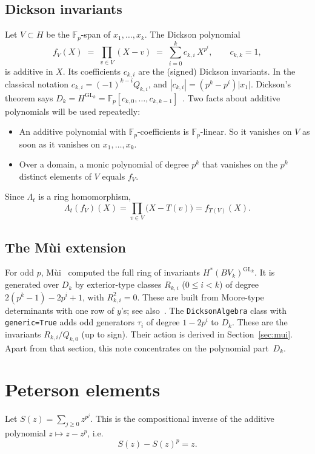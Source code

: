 \documentclass[11pt]{amsart}
\theoremstyle{definition}
\theoremstyle{remark}
\newcommand{\F}{\mathbb{F}_p}
\newcommand{\Dk}{D_k}
\newcommand{\code}[1]{\texttt{#1}}
\DeclareMathOperator{\GL}{GL}
\begin{document}
\subsection{Dickson invariants}
Let $V\subset H$ be the $\F$-span of $x_1,\dots,x_k$.  The Dickson polynomial
\[
  f_V(X)\;=\;\prod_{v\in V}(X-v)\;=\;\sum_{i=0}^k c_{k,i}\,X^{p^i},\qquad c_{k,k}=1,
\]
is additive in $X$.  Its coefficients $c_{k,i}$ are the (signed) Dickson
invariants.  In the classical notation $c_{k,i}=(-1)^{k-i}Q_{k,i}$, and
$|c_{k,i}|=(p^k-p^i)|x_1|$.  Dickson's theorem says
$\Dk=H^{\GL_k}=\F[c_{k,0},\dots,c_{k,k-1}]$~\cite{Dickson}.  Two facts about
additive polynomials will be used repeatedly:
\begin{itemize}
\item[(D1)] An additive polynomial with $\F$-coefficients is $\F$-linear.  So it
  vanishes on $V$ as soon as it vanishes on $x_1,\dots,x_k$.
\item[(D2)] Over a domain, a monic polynomial of degree $p^k$ that vanishes on
  the $p^k$ distinct elements of $V$ equals $f_V$.
\end{itemize}
Since $\Lambda_t$ is a ring homomorphism,
\begin{equation}\label{eq:Lf}
  \Lambda_t(f_V)(X)=\prod_{v\in V}\bigl(X-T(v)\bigr)=f_{T(V)}(X).
\end{equation}

\subsection{The M\`ui extension}
For odd $p$, M\`ui~\cite{Mui} computed the full ring of invariants
$H^*(BV_k)^{\GL_k}$.  It is generated over $\Dk$ by exterior-type classes
$R_{k,i}$ ($0\le i<k$) of degree $2(p^k-1)-2p^i+1$, with $R_{k,i}^2=0$.  These
are built from Moore-type determinants with one row of $y$'s; see
also~\cite{KamekoMimura}.  The \code{DicksonAlgebra} class with
\code{generic=True} adds odd generators $\tau_i$ of degree $1-2p^i$ to $\Dk$.
These are the invariants $R_{k,i}/Q_{k,0}$ (up to sign).  Their action is
derived in Section~\ref{sec:mui}.  Apart from that section, this note
concentrates on the polynomial part~$\Dk$.

\section{Peterson elements}\label{sec:peterson}

Let $S(z)=\sum_{j\ge0}z^{p^j}$.  This is the compositional inverse of the
additive polynomial $z\mapsto z-z^p$, i.e.
\begin{equation}\label{eq:S}
  S(z)-S(z)^p=z .
\end{equation}
\end{document}
